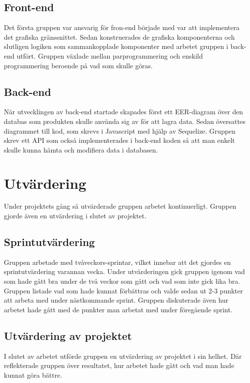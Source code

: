 \subsection{Front-end}
Det första gruppen var ansvarig för fron-end började med var att implementera det grafiska gränssnittet. Sedan konstruerades de grafiska komponenterna och slutligen logiken som sammankopplade komponenter med arbetet gruppen i back-end utfört. Gruppen växlade mellan parprogrammering och enskild programmering beroende på vad som skulle göras.       

\subsection{Back-end}
När utvecklingen av back-end startade skapades först ett EER-diagram över den databas som produkten skulle använda sig av för att lagra data. 
Sedan översattes diagrammet till kod, som skrevs i Javascript med hjälp av Sequelize. 
Gruppen skrev ett API som också implementerades i back-end koden så att man enkelt skulle kunna hämta och modifiera data i databasen.

\section{Utvärdering}
Under projektets gång så utvärderade gruppen arbetet kontinuerligt. Gruppen gjorde även en utvärdering i slutet av projektet.

\subsection{Sprintutvärdering}
Gruppen arbetade med tvåveckors-sprintar, vilket innebar att det gjordes en sprintutvärdering varannan vecka. Under utvärderingen gick gruppen igenom vad som hade gått bra under de två veckor som gått och vad som inte gick lika bra. Gruppen listade vad som hade kunnat förbättras och valde sedan ut 2-3 punkter att arbeta med under nästkommande sprint. Gruppen diskuterade även hur arbetet hade gått med de punkter man arbetat med under föregående sprint.

\subsection{Utvärdering av projektet}
I slutet av arbetet utförde gruppen en utvärdering av projektet i sin helhet. Där reflekterade gruppen över resultatet, hur arbetet hade gått och vad man hade kunnat göra bättre.
